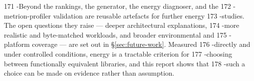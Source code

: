       171 -Beyond the rankings, the generator, the energy diagnoser, and the                                                                                                                                
      172 -\gls{metrion-profiler} validation are reusable artefacts for further energy                                                                                                                      
      173 -studies. The open questions they raise --- deeper architectural explanations,                                                                                                                    
      174 -more realistic and byte-matched workloads, and broader environmental and                                                                                                                         
      175 -platform coverage --- are set out in \S\ref{sec:future-work}. Measured                                                                                                                           
      176 -directly and under controlled conditions, energy is a tractable criterion for                                                                                                                    
      177 -choosing between functionally equivalent libraries, and this report shows that                                                                                                                   
      178 -such a choice can be made on evidence rather than assumption.   
